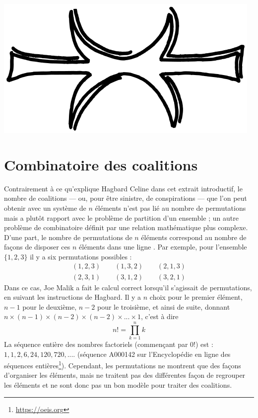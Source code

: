 \begin{center}
\includegraphics[scale=0.1]{./img/eris.png}
\end{center}

\section*{Combinatoire des coalitions}
Contrairement à ce qu'explique Hagbard Celine dans cet extrait introductif, le nombre de coalitions --- ou, pour être sinistre, de conspirations --- que l'on peut obtenir avec un système de $n$ éléments n'est pas lié au nombre de permutations mais a plutôt rapport avec le problème de partition d'un ensemble ; un autre problème de combinatoire définit par une relation mathématique plus complexe.\\

D'une part, le nombre de permutations de $n$ éléments correspond au nombre de façons de disposer ces $n$ éléments dans une ligne \cite{Graham1988}. Par exemple, pour l'ensemble $\{1,2,3\}$ il y a six permutations possibles :
\begin{gather*}
(1,2,3) \qquad (1,3,2) \qquad (2,1,3) \\ 
(2,3,1) \qquad (3,1,2) \qquad (3,2,1)
\end{gather*}
Dans ce cas, Joe Malik a fait le calcul correct lorsqu'il s'agissait de permutations, en suivant les instructions de Hagbard. Il y a $n$ choix pour le premier élément, $n-1$ pour le deuxième, $n-2$ pour le troisième, et ainsi de suite, donnant $n\times(n-1)\times(n-2)\times(n-2)\times...\times1$, c'est à dire
\begin{equation}
n ! = \prod\limits_{k = 1}^n k
\end{equation}
La séquence entière des nombres factoriels (commençant par $0!$) est : $1, 1, 2, 6, 24, 120, 720, ....$ (séquence A000142 sur l'Encyclopédie en ligne des séquences entières\footnote{\url{https://oeis.org}}).
Cependant, les permutations ne montrent que des façons d'organiser les éléments, mais ne traitent pas des différentes façon de regrouper les éléments et ne sont donc pas un bon modèle pour traiter des coalitions.\\


